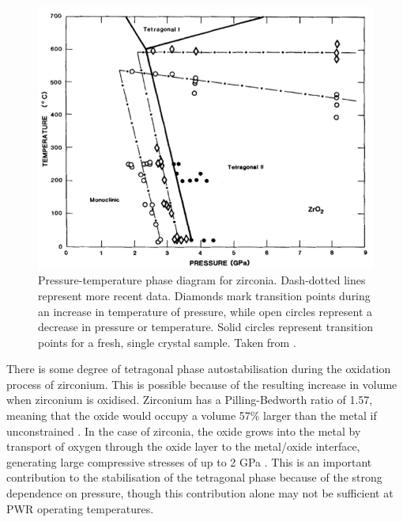 \begin{figure}[ht]
  \centering
      \includegraphics[width=13cm]{images/zirconiaphasediagram.png}
  \caption[Pressure-temperature phase diagram for zirconia. Dash-dotted lines represent more recent data. Diamonds mark transition points during an increase in temperature of pressure, while open circles represent a decrease in pressure or temperature. Solid circles represent transition points for a fresh, single crystal sample.]{Pressure-temperature phase diagram for zirconia. Dash-dotted lines represent more recent data. Diamonds mark transition points during an increase in temperature of pressure, while open circles represent a decrease in pressure or temperature. Solid circles represent transition points for a fresh, single crystal sample. Taken from \cite{block1985pressure}. \label{fig:phasediagram}}
\end{figure}


There is some degree of tetragonal phase autostabilisation during the oxidation process of zirconium. This is possible because of the resulting increase in volume when zirconium is oxidised. Zirconium has a Pilling-Bedworth ratio of 1.57, meaning that the oxide would occupy a volume 57\% larger than the metal if unconstrained \cite{cramer2003corrosion, Pilling1923}. In the case of zirconia, the oxide grows into the metal by transport of oxygen through the oxide layer to the metal/oxide interface, generating large compressive stresses of up to 2 GPa \cite{Petigny2000, garzarolli1991oxide}. This is an important contribution to the stabilisation of the tetragonal phase because of the strong dependence on pressure, though this contribution alone may not be sufficient at PWR operating temperatures.

